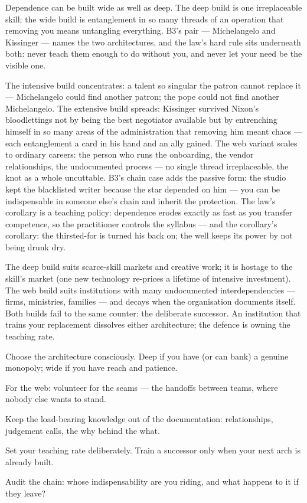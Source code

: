 \begin{core}
Dependence can be built wide as well as deep. The deep build is one irreplaceable skill; the wide build is entanglement in so many threads of an operation that removing you means untangling everything. B3's pair --- Michelangelo and Kissinger --- names the two architectures, and the law's hard rule sits underneath both: never teach them enough to do without you, and never let your need be the visible one.
\end{core}
\begin{mechanism}
The intensive build concentrates: a talent so singular the patron cannot replace it --- Michelangelo could find another patron; the pope could not find another Michelangelo. The extensive build spreads: Kissinger survived Nixon's bloodlettings not by being the best negotiator available but by entrenching himself in so many areas of the administration that removing him meant chaos --- each entanglement a card in his hand and an ally gained. The web variant scales to ordinary careers: the person who runs the onboarding, the vendor relationships, the undocumented process --- no single thread irreplaceable, the knot as a whole uncuttable. B3's chain case adds the passive form: the studio kept the blacklisted writer because the star depended on him --- you can be indispensable in someone else's chain and inherit the protection. The law's corollary is a teaching policy: dependence erodes exactly as fast as you transfer competence, so the practitioner controls the syllabus --- and the corollary's corollary: the thirsted-for is turned his back on; the well keeps its power by not being drunk dry.
\end{mechanism}
\begin{conditions}
The deep build suits scarce-skill markets and creative work; it is hostage to the skill's market (one new technology re-prices a lifetime of intensive investment). The web build suits institutions with many undocumented interdependencies --- firms, ministries, families --- and decays when the organisation documents itself. Both builds fail to the same counter: the deliberate successor. An institution that trains your replacement dissolves either architecture; the defence is owning the teaching rate.
\end{conditions}
\begin{application}
  \item Choose the architecture consciously. Deep if you have (or can bank) a genuine monopoly; wide if you have reach and patience.
  \item For the web: volunteer for the seams --- the handoffs between teams, where nobody else wants to stand.
  \item Keep the load-bearing knowledge out of the documentation: relationships, judgement calls, the why behind the what.
  \item Set your teaching rate deliberately. Train a successor only when your next arch is already built.
  \item Audit the chain: whose indispensability are you riding, and what happens to it if they leave?
\end{application}
